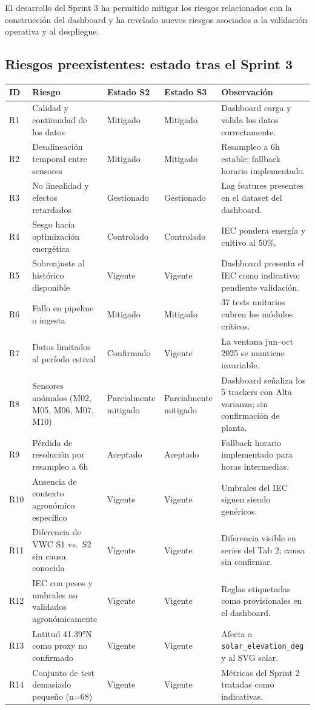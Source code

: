 \documentclass[11pt,a4paper]{article}
\begin{document}
El desarrollo del Sprint 3 ha permitido mitigar los riesgos relacionados con la construcción
del dashboard y ha revelado nuevos riesgos asociados a la validación operativa y al despliegue.

\subsection{Riesgos preexistentes: estado tras el Sprint 3}

\begin{longtable}{p{} p{} p{} p{} p{}}
\textbf{ID} & \textbf{Riesgo} & \textbf{Estado S2} & \textbf{Estado S3} & \textbf{Observación} \\
\hline
R1 & Calidad y continuidad de los datos & Mitigado & Mitigado & Dashboard carga y valida los datos correctamente. \\
R2 & Desalineación temporal entre sensores & Mitigado & Mitigado & Resampleo a 6h estable; fallback horario implementado. \\
R3 & No linealidad y efectos retardados & Gestionado & Gestionado & Lag features presentes en el dataset del dashboard. \\
R4 & Sesgo hacia optimización energética & Controlado & Controlado & IEC pondera energía y cultivo al 50\%. \\
R5 & Sobreajuste al histórico disponible & Vigente & Vigente & Dashboard presenta el IEC como indicativo; pendiente validación. \\
R6 & Fallo en pipeline o ingesta & Mitigado & Mitigado & 37 tests unitarios cubren los módulos críticos. \\
R7 & Datos limitados al período estival & Confirmado & Vigente & La ventana jun–oct 2025 se mantiene invariable. \\
R8 & Sensores anómalos (M02, M05, M06, M07, M10) & Parcialmente mitigado & Parcialmente mitigado & Dashboard señaliza los 5 trackers con Alta varianza; sin confirmación de planta. \\
R9 & Pérdida de resolución por resampleo a 6h & Aceptado & Aceptado & Fallback horario implementado para horas intermedias. \\
R10 & Ausencia de contexto agronómico específico & Vigente & Vigente & Umbrales del IEC siguen siendo genéricos. \\
R11 & Diferencia de VWC S1 vs.\ S2 sin causa conocida & Vigente & Vigente & Diferencia visible en series del Tab 2; causa sin confirmar. \\
R12 & IEC con pesos y umbrales no validados agronómicamente & Vigente & Vigente & Reglas etiquetadas como provisionales en el dashboard. \\
R13 & Latitud 41.39°N como proxy no confirmado & Vigente & Vigente & Afecta a \texttt{solar\_elevation\_deg} y al SVG solar. \\
R14 & Conjunto de test demasiado pequeño (n=68) & Vigente & Vigente & Métricas del Sprint 2 tratadas como indicativas. \\
\end{longtable}
\end{document}
